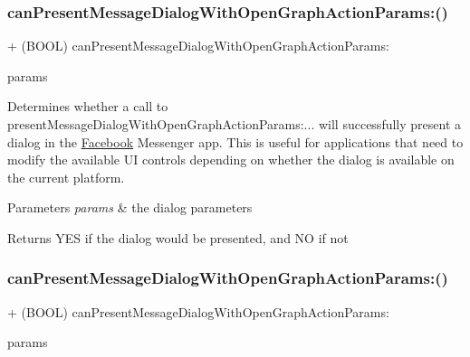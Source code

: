 \subsubsection{\texorpdfstring{can\+Present\+Message\+Dialog\+With\+Open\+Graph\+Action\+Params\+:()}{canPresentMessageDialogWithOpenGraphActionParams:()}\hspace{0.1cm}{\footnotesize\ttfamily [3/5]}}
{\footnotesize\ttfamily + (B\+O\+OL) can\+Present\+Message\+Dialog\+With\+Open\+Graph\+Action\+Params\+: \begin{DoxyParamCaption}\item[{(\hyperlink{interfaceFBOpenGraphActionParams}{F\+B\+Open\+Graph\+Action\+Params} $\ast$)}]{params }\end{DoxyParamCaption}}

Determines whether a call to {\ttfamily present\+Message\+Dialog\+With\+Open\+Graph\+Action\+Params\+:...} will successfully present a dialog in the \hyperlink{interfaceFacebook}{Facebook} Messenger app. This is useful for applications that need to modify the available UI controls depending on whether the dialog is available on the current platform.


\begin{DoxyParams}{Parameters}
{\em params} & the dialog parameters\\
\hline
\end{DoxyParams}
\begin{DoxyReturn}{Returns}
Y\+ES if the dialog would be presented, and NO if not 
\end{DoxyReturn}
\mbox{\label{interfaceFBDialogs_abc596dd117701ceb160dd63db514cf11}} 
\subsubsection{\texorpdfstring{can\+Present\+Message\+Dialog\+With\+Open\+Graph\+Action\+Params\+:()}{canPresentMessageDialogWithOpenGraphActionParams:()}\hspace{0.1cm}{\footnotesize\ttfamily [4/5]}}
{\footnotesize\ttfamily + (B\+O\+OL) can\+Present\+Message\+Dialog\+With\+Open\+Graph\+Action\+Params\+: \begin{DoxyParamCaption}\item[{(\hyperlink{interfaceFBOpenGraphActionParams}{F\+B\+Open\+Graph\+Action\+Params} $\ast$)}]{params }\end{DoxyParamCaption}}

